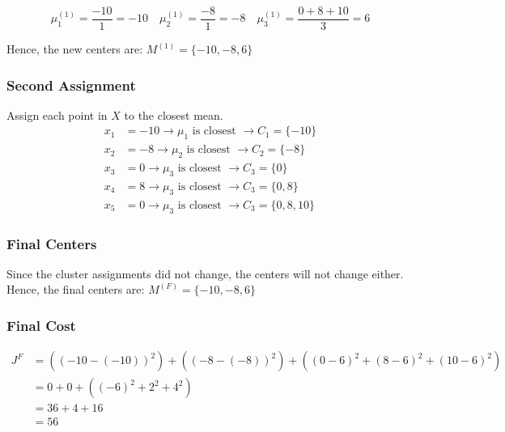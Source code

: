 \documentclass{article}
\begin{document}
$$\mu_1^{(1)} = \frac{-10}{1} = -10 \quad \mu_2^{(1)} = \frac{-8}{1} = -8 \quad \mu_3^{(1)} = \frac{0 + 8 + 10}{3} = 6 $$

\begin{flushleft}
  Hence, the new centers are: $ M^{(1)} = \{-10,-8,6\}$
\end{flushleft}


\subsubsection*{Second Assignment}
Assign each point in $X$ to the closest mean.
\begin{align*}
  x_1 &= -10 \rightarrow \mu_1 \text{ is closest } \rightarrow C_1 = \{-10\} \\
  x_2 &= -8 \rightarrow \mu_2 \text{ is closest } \rightarrow C_2 = \{-8\} \\
  x_3 &= 0 \rightarrow \mu_3 \text{ is closest } \rightarrow C_3 = \{0\} \\
  x_4 &= 8 \rightarrow \mu_3 \text{ is closest } \rightarrow C_3 = \{0, 8\} \\
  x_5 &= 0 \rightarrow \mu_3 \text{ is closest } \rightarrow C_3 = \{0, 8 ,10\} 
\end{align*}

\subsubsection*{Final Centers}

\begin{flushleft}
  Since the cluster assignments did not change, the centers will not change either. \\
  Hence, the final centers are: $ M^{(F)} = \{-10,-8,6\}$
\end{flushleft}

\subsubsection*{Final Cost}

\begin{align*}
    J^F &= \left( (-10 - (-10))^2 \right) + \left( (-8 - (-8))^2 \right) + \left( (0 - 6)^2 + (8 - 6)^2 + (10 - 6)^2 \right) \\
    &= 0 + 0 + \left( (-6)^2 + 2^2 + 4^2 \right) \\
    &= 36 + 4 + 16 \\
    &= 56
\end{align*}
\end{document}
